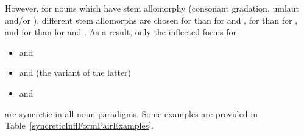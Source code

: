 However, for nouns which have stem allomorphy (consonant gradation, umlaut and/or \jvh), different stem allomorphs are chosen for  than for  and , for  than for , and for  than for  and .
As a result, only the inflected forms for
\begin{itemize}
\item{ and }
\item{ and  (the  variant of the latter)}
\item{ and }
\end{itemize}
are syncretic in all noun paradigms. Some examples are provided in Table~\vref{syncreticInflFormPairExamples}.
